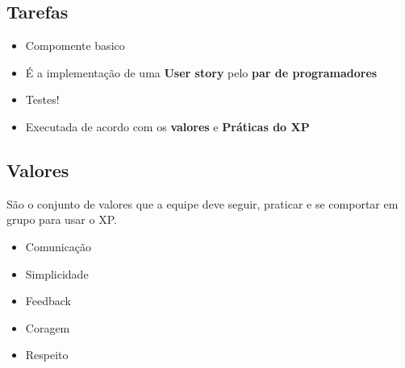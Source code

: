 \documentclass[10pt]{beamer}
\begin{document}
\subsection{Tarefas}
\begin{frame}
  \begin{itemize}
  \item Compomente basico
  \item É a implementação de uma \textbf{User story} pelo \textbf{par de programadores}
  \item Testes!
  \item Executada de acordo com os \textbf{valores} e \textbf{Práticas do XP}
  \end{itemize}
  \begin{figure}
    \centering
  \end{figure}
\end{frame}



\subsection{Valores}
\begin{frame}
  \begin{block}{}
    São o conjunto de valores que a equipe deve seguir, praticar e se comportar em grupo para usar o XP.
  \end{block}
  \begin{itemize}
  \item Comunicação
  \item Simplicidade
  \item Feedback
  \item Coragem
  \item Respeito
  \end{itemize}
\end{frame}
\end{document}
